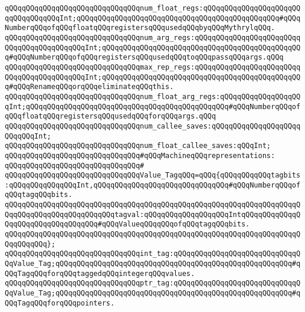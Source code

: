 \verb|qQQqqQQqqQQqqQQqqQQqqQQqqQQqqQQqnum_float_regs:qQQqqQQqqQQqqQQqqQQqqQQqqQQqqQQqqQQqInt;qQQqqQQqqQQqqQQqqQQqqQQqqQQqqQQqqQQqqQQqqQQqqQQq#qQQqNumberqQQqofqQQqfloatqQQqregistersqQQqusedqQQqbyqQQqMythrylqQQq.|\newline
\verb|qQQqqQQqqQQqqQQqqQQqqQQqqQQqqQQqnum_arg_regs:qQQqqQQqqQQqqQQqqQQqqQQqqQQqqQQqqQQqqQQqqQQqInt;qQQqqQQqqQQqqQQqqQQqqQQqqQQqqQQqqQQqqQQqqQQqqQQq#qQQqNumberqQQqofqQQqregistersqQQqusedqQQqtoqQQqpassqQQqargs.qQQq|\newline
\verb|qQQqqQQqqQQqqQQqqQQqqQQqqQQqqQQqmax_rep_regs:qQQqqQQqqQQqqQQqqQQqqQQqqQQqqQQqqQQqqQQqqQQqInt;qQQqqQQqqQQqqQQqqQQqqQQqqQQqqQQqqQQqqQQqqQQqqQQq#qQQqRenameqQQqorqQQqeliminateqQQqthis.|\newline
\verb|qQQqqQQqqQQqqQQqqQQqqQQqqQQqqQQqnum_float_arg_regs:qQQqqQQqqQQqqQQqqQQqInt;qQQqqQQqqQQqqQQqqQQqqQQqqQQqqQQqqQQqqQQqqQQqqQQq#qQQqNumberqQQqofqQQqfloatqQQqregistersqQQqusedqQQqforqQQqargs.qQQq|\newline
\verb|qQQqqQQqqQQqqQQqqQQqqQQqqQQqqQQqnum_callee_saves:qQQqqQQqqQQqqQQqqQQqqQQqqQQqInt;|\newline
\verb|qQQqqQQqqQQqqQQqqQQqqQQqqQQqqQQqnum_float_callee_saves:qQQqInt;|\newline
\newline
\verb|qQQqqQQqqQQqqQQqqQQqqQQqqQQqqQQq#qQQqMachineqQQqrepresentations:|\newline
\verb|qQQqqQQqqQQqqQQqqQQqqQQqqQQqqQQq#|\newline
\verb|qQQqqQQqqQQqqQQqqQQqqQQqqQQqqQQqValue_TagqQQq=qQQq{qQQqqQQqqQQqtagbits:qQQqqQQqqQQqqQQqInt,qQQqqQQqqQQqqQQqqQQqqQQqqQQqqQQq#qQQqNumberqQQqofqQQqtagqQQqbits.|\newline
\verb|qQQqqQQqqQQqqQQqqQQqqQQqqQQqqQQqqQQqqQQqqQQqqQQqqQQqqQQqqQQqqQQqqQQqqQQqqQQqqQQqqQQqqQQqqQQqqQQqtagval:qQQqqQQqqQQqqQQqqQQqIntqQQqqQQqqQQqqQQqqQQqqQQqqQQqqQQqqQQq#qQQqValueqQQqqQQqofqQQqtagqQQqbits.|\newline
\verb|qQQqqQQqqQQqqQQqqQQqqQQqqQQqqQQqqQQqqQQqqQQqqQQqqQQqqQQqqQQqqQQqqQQqqQQqqQQqqQQq};|\newline
\newline
\verb|qQQqqQQqqQQqqQQqqQQqqQQqqQQqqQQqint_tag:qQQqqQQqqQQqqQQqqQQqqQQqqQQqqQQqValue_Tag;qQQqqQQqqQQqqQQqqQQqqQQqqQQqqQQqqQQqqQQqqQQqqQQqqQQqqQQq#qQQqTagqQQqforqQQqtaggedqQQqintegerqQQqvalues.|\newline
\verb|qQQqqQQqqQQqqQQqqQQqqQQqqQQqqQQqptr_tag:qQQqqQQqqQQqqQQqqQQqqQQqqQQqqQQqValue_Tag;qQQqqQQqqQQqqQQqqQQqqQQqqQQqqQQqqQQqqQQqqQQqqQQqqQQqqQQq#qQQqTagqQQqforqQQqpointers.|\newline
